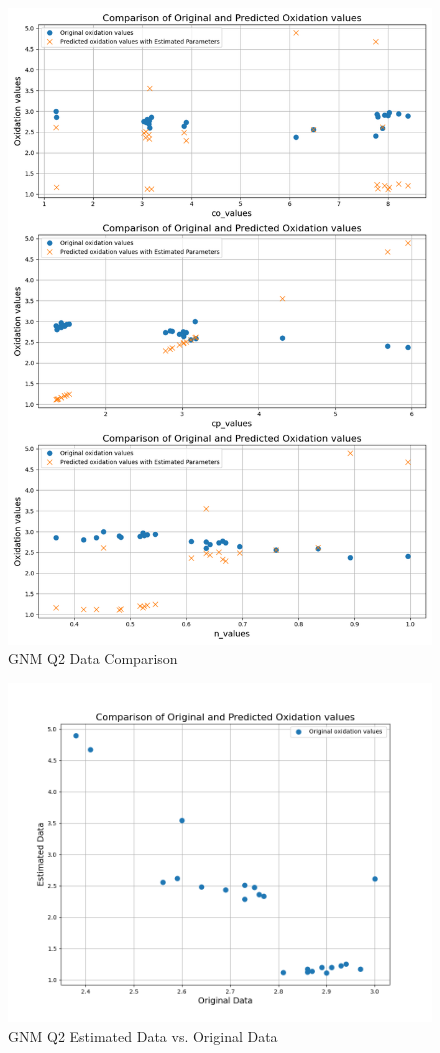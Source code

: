 \documentclass[a4paper,12pt]{article} %
\begin{document}
\begin{figure}[ht]
    \centering
    \includegraphics[width=1\textwidth]{GNM_Q2_ParamComp.png}
    \caption{GNM Q2 Data Comparison }
\end{figure}

\begin{figure}[ht]
    \centering
    \includegraphics[width=1\textwidth]{GNM_Q2_ParamComp_1.png}
    \caption{GNM Q2 Estimated Data vs. Original Data}
\end{figure}
\end{document}
